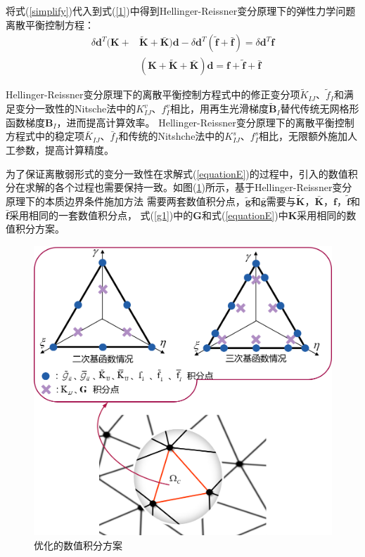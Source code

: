 将式(\ref{simplify})代入到式(\ref{1})中得到Hellinger-Reissner变分原理下的弹性力学问题离散平衡控制方程：
\begin{equation}\label{equationE}
\begin{split}
    \delta\pmb{d}^T(\pmb{K}+&\tilde{\pmb{K}}+\bar{\pmb{K}})\pmb{d}-\delta\pmb{d}^T(\tilde{\pmb{f}}+\bar{\pmb{f}})=\delta\pmb{d}^T\pmb{f}\\
    &(\pmb{K}+\pmb{\tilde{K}}+\pmb{\bar{K}})\pmb{d}=\pmb{f}+\tilde{\pmb{f}}+\bar{\pmb{f}}
\end{split}
\end{equation}\par
Hellinger-Reissner变分原理下的离散平衡控制方程式中的修正变分项$\tilde{K}_{IJ}$、$\tilde{f}_I$和满足变分一致性的Nitsche法中的$K_{IJ}^v$、$f_I^v$相比，用再生光滑梯度$\tilde{\pmb{B}}_I$替代传统无网格形函数梯度$\pmb{B}_I$，进而提高计算效率。
Hellinger-Reissner变分原理下的离散平衡控制方程式中的稳定项$\bar{K}_{IJ}$、$\bar{f}_I$和传统的Nitshche法中的$K^s_{IJ}$、$f^s_I$相比，无限额外施加人工参数，提高计算精度。\par
为了保证离散弱形式的变分一致性在求解式(\ref{equationE})的过程中，引入的数值积分在求解的各个过程也需要保持一致。如图(\ref{Eintegralscheme})所示，基于Hellinger-Reissner变分原理下的本质边界条件施加方法
需要两套数值积分点\cite{}，$\tilde{\pmb g}$和$\bar{\pmb g}$需要与$\tilde{\pmb{K}}$，$\bar{\pmb{K}}$，$\pmb{f}$，$\tilde{\pmb{f}}$和$\bar{\pmb{f}}$采用相同的一套数值积分点，
式(\ref{g1})中的$\pmb{G}$和式(\ref{equationE})中$\pmb{K}$采用相同的数值积分方案。\par
\begin{figure}[H]
    \centering
    \includegraphics[scale=0.6]{figure/EHR/Eintegralscheme.png}
    \caption{优化的数值积分方案}\label{Eintegralscheme}
\end{figure}
